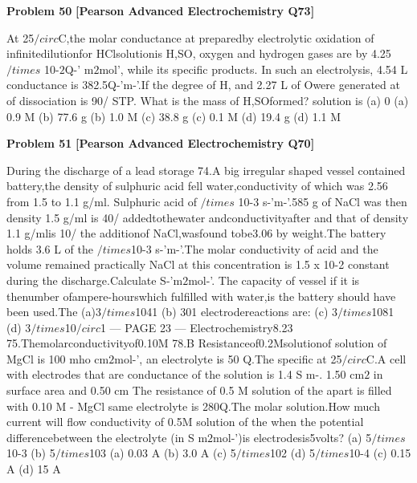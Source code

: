 \begin{problembox}
\textbf{Problem 50} \hfill \textbf{[Pearson Advanced Electrochemistry Q73]}
\label{q:ext-pearson-50}

At 25$/circ$C,the molar conductance at
preparedby electrolytic oxidation of
infinitedilutionfor HClsolutionis
H,SO, oxygen and hydrogen gases are by
4.25 $/times$ 10-$2$Q-' m$2$mol', while its specific
products. In such an electrolysis, 4.54 L
conductance is 382.5Q-'m-'.If the degree
of H, and 2.27 L of Owere generated at
of dissociation is 90/%
STP. What is the mass of H,SOformed?
solution is
(a) 0
(a) 0.9 M
(b) 77.6 g
(b) 1.0 M
(c) 38.8 g
(c) 0.1 M
(d) 19.4 g
(d) 1.1 M
\end{problembox}

\begin{problembox}
\textbf{Problem 51} \hfill \textbf{[Pearson Advanced Electrochemistry Q70]}
\label{q:ext-pearson-51}

During the discharge of a lead storage
74.A big irregular shaped vessel contained
battery,the density of sulphuric acid fell
water,conductivity of which was 2.56
from 1.5 to 1.1 g/ml. Sulphuric acid of
$/times$ 10-3 s-'m-'.585 g of NaCl was then
density 1.5 g/ml is 40/%
addedtothewater andconductivityafter
and that of density 1.1 g/mlis 10/%
the additionof NaCl,wasfound tobe3.06
by weight.The battery holds 3.6 L of the
$/times$10-3 s-'m-'.The molar conductivity of
acid and the volume remained practically
NaCl at this concentration is 1.5 x 10-2
constant during the discharge.Calculate
S-'m$2$mol-'. The capacity of vessel if it is
thenumber ofampere-hourswhich
fulfilled with water,is
the battery should have been used.The
(a)3$/times$1041
(b) 301
electrodereactions are:
(c) 3$/times$1081
(d) 3$/times$10$/circ$1
--- PAGE 23 ---
Electrochemistry8.23
75.Themolarconductivityof0.10M
78.B
Resistanceof0.2Msolutionof
solution of MgCl is 100 mho cm$2$mol-',
an electrolyte is 50 Q.The specific
at 25$/circ$C.A cell with electrodes that are
conductance of the solution is 1.4 S m-.
1.50 cm$2$ in surface area and 0.50 cm
The resistance of 0.5 M solution of the
apart is filled with 0.10 M - MgCl
same electrolyte is 280Q.The molar
solution.How much current will flow
conductivity of 0.5M solution of the
when the potential differencebetween the
electrolyte (in S m$2$mol-')is
electrodesis5volts?
(a) 5$/times$10-3
(b) 5$/times$103
(a) 0.03 A
(b) 3.0 A
(c) 5$/times$102
(d) 5$/times$10-4
(c) 0.15 A
(d) 15 A
\end{problembox}

